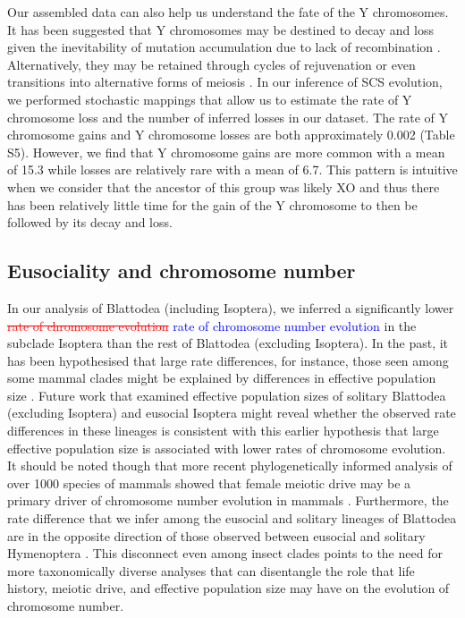 \documentclass[]{rsos}%
\begin{document}
Our assembled data can also help us understand the fate of the Y chromosomes. 
It has been suggested that Y chromosomes may be destined to decay and loss given the inevitability of mutation accumulation due to lack of recombination \cite{steinemann2005}.
Alternatively, they may be retained through cycles of rejuvenation or even transitions into alternative forms of meiosis \cite{blackmon2015bioessay}.
In our inference of SCS evolution, we performed stochastic mappings that allow us to estimate the rate of Y chromosome loss and the number of inferred losses in our dataset.
The rate of Y chromosome gains and Y chromosome losses are both approximately 0.002 (Table S5). 
However, we find that Y chromosome gains are more common with a mean of 15.3 while losses are relatively rare with a mean of 6.7. 
This pattern is intuitive when we consider that the ancestor of this group was likely XO and thus there has been relatively little time for the gain of the Y chromosome to then be followed by its decay and loss.

\subsection{Eusociality and chromosome number}
In our analysis of Blattodea (including Isoptera), we inferred a significantly lower \textcolor{red}{\st{rate of chromosome evolution}} \textcolor{blue}{rate of chromosome number evolution} in the subclade Isoptera than the rest of Blattodea (excluding Isoptera).
In the past, it has been hypothesised that large rate differences, for instance, those seen among some mammal clades might be explained by differences in effective population size \cite{bush1977rapid}.
Future work that examined effective population sizes of solitary Blattodea (excluding Isoptera) and eusocial Isoptera might reveal whether the observed rate differences in these lineages is consistent with this earlier hypothesis that large effective population size is associated with lower rates of chromosome evolution.
It should be noted though that more recent phylogenetically informed analysis of over 1000 species of mammals showed that female meiotic drive may be a primary driver of chromosome number evolution in mammals \cite{blackmon2019meiotic}.
Furthermore, the rate difference that we infer among the eusocial and solitary lineages of Blattodea are in the opposite direction of those observed between eusocial and solitary Hymenoptera \cite{ross2015}.
This disconnect even among insect clades points to the need for more taxonomically diverse analyses that can disentangle the role that life history, meiotic drive, and effective population size may have on the evolution of chromosome number.
\end{document}
